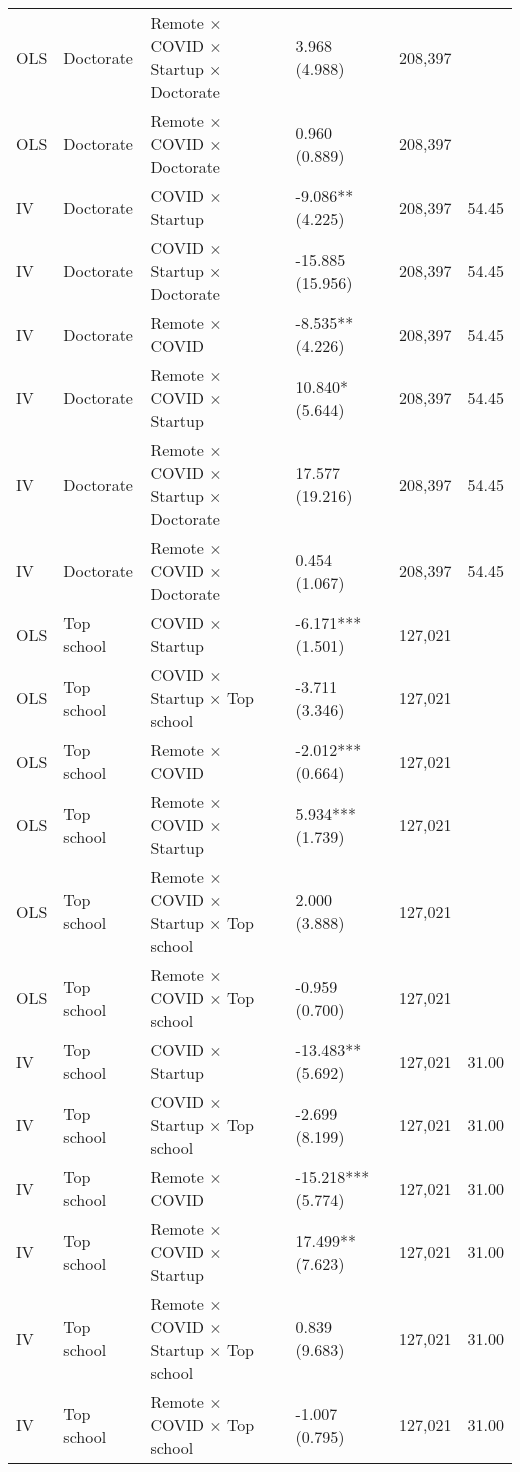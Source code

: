 \documentclass[11pt]{article}
\begin{document}
{\begin{longtable}{llllrr}
OLS & Doctorate & Remote $\times$ COVID $\times$ Startup × Doctorate &  3.968 (4.988) & 208,397 &  \\
OLS & Doctorate & Remote $\times$ COVID × Doctorate &  0.960 (0.889) & 208,397 &  \\
IV & Doctorate & COVID $\times$ Startup & -9.086** (4.225) & 208,397 & 54.45 \\
IV & Doctorate & COVID $\times$ Startup × Doctorate & -15.885 (15.956) & 208,397 & 54.45 \\
IV & Doctorate & Remote $\times$ COVID & -8.535** (4.226) & 208,397 & 54.45 \\
IV & Doctorate & Remote $\times$ COVID $\times$ Startup &  10.840* (5.644) & 208,397 & 54.45 \\
IV & Doctorate & Remote $\times$ COVID $\times$ Startup × Doctorate &  17.577 (19.216) & 208,397 & 54.45 \\
IV & Doctorate & Remote $\times$ COVID × Doctorate &  0.454 (1.067) & 208,397 & 54.45 \\
OLS & Top school & COVID $\times$ Startup & -6.171*** (1.501) & 127,021 &  \\
OLS & Top school & COVID $\times$ Startup × Top school & -3.711 (3.346) & 127,021 &  \\
OLS & Top school & Remote $\times$ COVID & -2.012*** (0.664) & 127,021 &  \\
OLS & Top school & Remote $\times$ COVID $\times$ Startup &  5.934*** (1.739) & 127,021 &  \\
OLS & Top school & Remote $\times$ COVID $\times$ Startup × Top school &  2.000 (3.888) & 127,021 &  \\
OLS & Top school & Remote $\times$ COVID × Top school & -0.959 (0.700) & 127,021 &  \\
IV & Top school & COVID $\times$ Startup & -13.483** (5.692) & 127,021 & 31.00 \\
IV & Top school & COVID $\times$ Startup × Top school & -2.699 (8.199) & 127,021 & 31.00 \\
IV & Top school & Remote $\times$ COVID & -15.218*** (5.774) & 127,021 & 31.00 \\
IV & Top school & Remote $\times$ COVID $\times$ Startup &  17.499** (7.623) & 127,021 & 31.00 \\
IV & Top school & Remote $\times$ COVID $\times$ Startup × Top school &  0.839 (9.683) & 127,021 & 31.00 \\
IV & Top school & Remote $\times$ COVID × Top school & -1.007 (0.795) & 127,021 & 31.00 \\

\end{longtable}}
\end{document}
